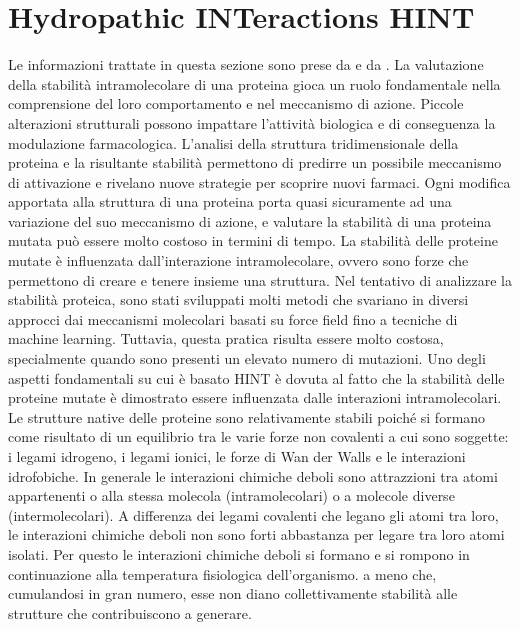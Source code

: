 \section{Hydropathic INTeractions HINT}\label{sec:cap_sec_subsec}
Le informazioni trattate in questa sezione sono prese da \cite{AgostaCozzini} e da \cite{ForzaIntramolecolare}.
La valutazione della stabilità intramolecolare di una proteina gioca un ruolo fondamentale nella comprensione del loro comportamento e nel meccanismo di azione. Piccole alterazioni strutturali possono impattare l'attività biologica e di conseguenza la modulazione farmacologica. 
L'analisi della struttura tridimensionale della proteina e la risultante stabilità permettono di predirre un possibile meccanismo di attivazione e rivelano nuove strategie per scoprire nuovi farmaci. Ogni modifica apportata alla struttura di una proteina porta quasi sicuramente ad una variazione del suo meccanismo di azione, e valutare la stabilità di una proteina mutata può essere molto costoso in termini di tempo.
La stabilità delle proteine mutate è influenzata dall'interazione intramolecolare, ovvero sono forze che permettono di creare e tenere insieme una struttura. Nel tentativo di analizzare la stabilità proteica, sono stati sviluppati molti metodi che svariano in diversi approcci dai meccanismi molecolari basati su force field fino a tecniche di machine learning. Tuttavia, questa pratica risulta essere molto costosa, specialmente quando sono presenti un elevato numero di mutazioni. Uno degli aspetti fondamentali su cui è basato HINT è dovuta al fatto che la stabilità delle proteine mutate è dimostrato essere influenzata dalle interazioni intramolecolari. Le strutture native delle proteine sono relativamente stabili poiché si formano come risultato di un equilibrio tra le varie forze non covalenti a cui sono soggette: i legami idrogeno, i legami ionici, le forze di Wan der Walls e le interazioni idrofobiche. In generale le interazioni chimiche deboli sono attrazzioni tra atomi appartenenti o alla stessa molecola (intramolecolari) o a molecole diverse (intermolecolari). A differenza dei legami covalenti che legano gli atomi tra loro, le interazioni chimiche deboli non sono forti abbastanza per legare tra loro atomi isolati. Per questo le interazioni chimiche deboli si formano e si rompono in continuazione alla temperatura fisiologica dell'organismo. a meno che, cumulandosi in gran numero, esse non diano collettivamente stabilità alle strutture che contribuiscono a generare.

